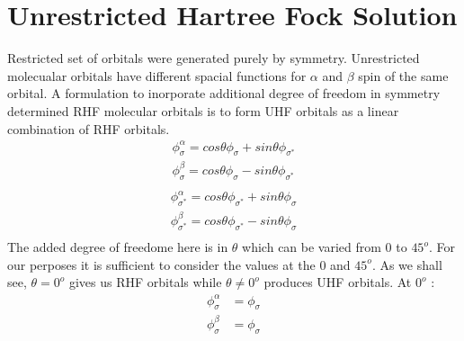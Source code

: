 \documentclass[11pt]{article}   	%
\begin{document}
\section{Unrestricted Hartree Fock Solution}
	Restricted set of orbitals were generated purely by symmetry. Unrestricted molecualar orbitals have different 
	spacial functions for $\alpha$ and $\beta$ spin of the same orbital. A formulation to inorporate additional degree of freedom in symmetry 
	determined RHF molecular orbitals is to form UHF orbitals as a linear combination of RHF orbitals. \\
	\begin{equation}
	\begin{split}
		\phi_{\sigma}^{\alpha}=cos\theta \phi_{\sigma}+sin\theta \phi_{\sigma^*}\\
		\phi_{\sigma}^{\beta}=cos\theta \phi_{\sigma}-sin\theta \phi_{\sigma^*}\\
	\end{split}
	\end{equation}
	\begin{equation}
	\begin{split}
		\phi_{\sigma^*}^{\alpha}=cos\theta \phi_{\sigma^*}+sin\theta \phi_{\sigma}\\
		\phi_{\sigma^*}^{\beta}=cos\theta \phi_{\sigma^*}-sin\theta \phi_{\sigma}\\
	\end{split}
	\end{equation}
	The added degree of freedome here is in $\theta$ which can be varied from 0 to $45^o$. For our perposes it is sufficient to consider the 
	values at the 0 and $45^o$. As we shall see, $\theta=0^o$ gives us RHF orbitals while $\theta\neq0^o$ 
	produces UHF orbitals. At $0^o$ :\\
	\begin{equation}
		\begin{split}
		\phi_{\sigma}^{\alpha}&=\phi_{\sigma}\\
		\phi_{\sigma}^{\beta}&=\phi_{\sigma}\\
		\end{split}
	\end{equation}
\end{document}
